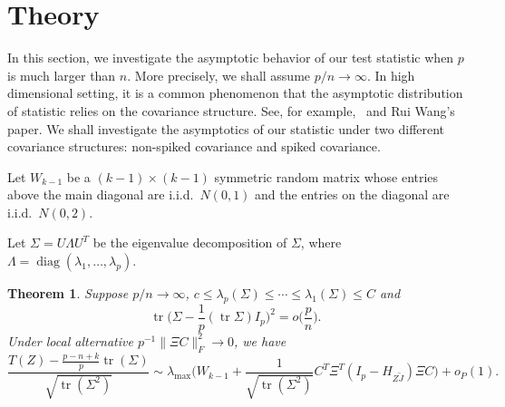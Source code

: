 \documentclass[review]{elsarticle}
\DeclareMathOperator{\mytr}{tr}
\DeclareMathOperator{\mydiag}{diag}
\theoremstyle{plain}
\newtheorem{theorem}{\quad\quad Theorem}
\theoremstyle{definition}
\theoremstyle{remark}
\begin{document}
   
   
   










\section{Theory}

In this section, we investigate the asymptotic behavior of our test statistic when $p$ is much larger than $n$.
More precisely, we shall assume $p/n\to\infty$.
In high dimensional setting, it is a common phenomenon that the asymptotic distribution of statistic relies on the covariance structure.
See, for example,~\cite{Ma2015A} and Rui Wang's paper.
We shall investigate the asymptotics of our statistic under two different covariance structures: non-spiked covariance and spiked covariance.


Let $W_{k-1}$ be a $(k-1)\times(k-1)$ symmetric random matrix whose entries above the main diagonal are i.i.d.\ $N(0,1)$ and the entries on the diagonal are i.i.d.\ $N(0,2)$.


Let $\Sigma= U\Lambda U^T$ be the eigenvalue decomposition of $\Sigma$, where $\Lambda =\mydiag (\lambda_1,\ldots,\lambda_p)$.


\begin{theorem}\label{nonSpiked}
    Suppose $p/n\to \infty$, $c\leq \lambda_p(\Sigma)\leq \cdots\leq \lambda_1(\Sigma)\leq C$ and
    $$
    \mytr\Big(\Sigma-\frac{1}{p}(\mytr\Sigma)I_p\Big)^2=o\big(\frac{p}{n}\big).
    $$
    Under local alternative $p^{-1}\|\Xi C\|_F^2\to 0$,
    we have
    $$
    \frac{T(Z)-\frac{p-n+k}{p}\mytr(\Sigma)}{\sqrt{\mytr(\Sigma^2)}}
    \sim
    \lambda_{\max}\Big( W_{k-1} +\frac{1}{\sqrt{\mytr(\Sigma^2)}} C^T \Xi^T (I_p-H_{Z\tilde{J}})\Xi C\Big)+o_P(1).
    $$
\end{theorem}
\end{document}
